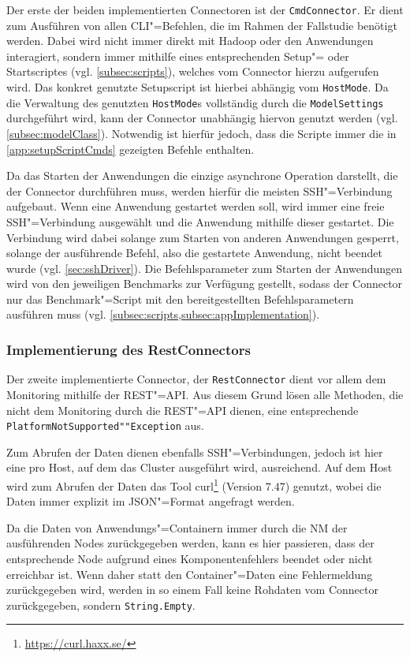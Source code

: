 Der erste der beiden implementierten Connectoren ist der \texttt{CmdConnector}.
Er dient zum Ausführen von allen CLI"=Befehlen, die im Rahmen der Fallstudie benötigt werden.
Dabei wird nicht immer direkt mit Hadoop oder den Anwendungen interagiert, sondern immer mithilfe eines entsprechenden Setup"= oder Startscriptes (vgl. \cref{subsec:scripts}), welches vom Connector hierzu aufgerufen wird.
Das konkret genutzte Setupscript ist hierbei abhängig vom \texttt{HostMode}.
Da die Verwaltung des genutzten \texttt{HostMode}s vollständig durch die \texttt{ModelSettings} durchgeführt wird, kann der Connector unabhängig hiervon genutzt werden (vgl. \cref{subsec:modelClass}).
Notwendig ist hierfür jedoch, dass die Scripte immer die in \cref{app:setupScriptCmds} gezeigten Befehle enthalten.

Da das Starten der Anwendungen die einzige asynchrone Operation darstellt, die der Connector durchführen muss, werden hierfür die meisten SSH"=Verbindung aufgebaut.
Wenn eine Anwendung gestartet werden soll, wird immer eine freie SSH"=Verbindung ausgewählt und die Anwendung mithilfe dieser gestartet.
Die Verbindung wird dabei solange zum Starten von anderen Anwendungen gesperrt, solange der ausführende Befehl, also die gestartete Anwendung, nicht beendet wurde (vgl. \cref{sec:sshDriver}).
Die Befehlsparameter zum Starten der Anwendungen wird von den jeweiligen Benchmarks zur Verfügung gestellt, sodass der Connector nur das Benchmark"=Script mit den bereitgestellten Befehlsparametern ausführen muss (vgl. \cref{subsec:scripts,subsec:appImplementation}).

\subsubsection{Implementierung des RestConnectors}
\label{subsubsec:implRestConnector}

Der zweite implementierte Connector, der \texttt{RestConnector} dient vor allem dem Monitoring mithilfe der REST"=API.
Aus diesem Grund lösen alle Methoden, die nicht dem Monitoring durch die REST"=API dienen, eine entsprechende \texttt{PlatformNotSupported""Exception} aus.

Zum Abrufen der Daten dienen ebenfalls SSH"=Verbindungen, jedoch ist hier eine pro Host, auf dem das Cluster ausgeführt wird, ausreichend.
Auf dem Host wird zum Abrufen der Daten das Tool curl\footnote{\url{https://curl.haxx.se/}} (Version 7.47) genutzt, wobei die Daten immer explizit im JSON"=Format angefragt werden.

Da die Daten von Anwendungs"=Containern immer durch die \ac{NM} der ausführenden Nodes zurückgegeben werden, kann es hier passieren, dass der entsprechende Node aufgrund eines Komponentenfehlers beendet oder nicht erreichbar ist.
Wenn daher statt den Container"=Daten eine Fehlermeldung zurückgegeben wird, werden in so einem Fall keine Rohdaten vom Connector zurückgegeben, sondern \texttt{String.Empty}.

